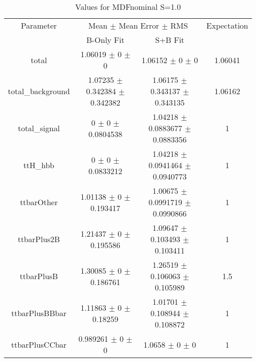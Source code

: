 \begin{table}
\centering
\caption{Values for MDFnominal S=1.0}
\begin{tabular}{cccc}
\toprule
Parameter & \multicolumn{2}{c}{Mean $\pm$ Mean Error $\pm$ RMS} & Expectation\\
 & B-Only Fit & S+B Fit & \\
\midrule
total & \num{1.06019} $\pm$ \num{0} $\pm$ \num{0} & \num{1.06152} $\pm$ \num{0} $\pm$ \num{0} & \num{1.06041}\\
total\_background & \num{1.07235} $\pm$ \num{0.342384} $\pm$ \num{0.342382} & \num{1.06175} $\pm$ \num{0.343137} $\pm$ \num{0.343135} & \num{1.06162}\\
total\_signal & \num{0} $\pm$ \num{0} $\pm$ \num{0.0804538} & \num{1.04218} $\pm$ \num{0.0883677} $\pm$ \num{0.0883356} & \num{1}\\
ttH\_hbb & \num{0} $\pm$ \num{0} $\pm$ \num{0.0833212} & \num{1.04218} $\pm$ \num{0.0941464} $\pm$ \num{0.0940773} & \num{1}\\
ttbarOther & \num{1.01138} $\pm$ \num{0} $\pm$ \num{0.193417} & \num{1.00675} $\pm$ \num{0.0991719} $\pm$ \num{0.0990866} & \num{1}\\
ttbarPlus2B & \num{1.21437} $\pm$ \num{0} $\pm$ \num{0.195586} & \num{1.09647} $\pm$ \num{0.103493} $\pm$ \num{0.103411} & \num{1}\\
ttbarPlusB & \num{1.30085} $\pm$ \num{0} $\pm$ \num{0.186761} & \num{1.26519} $\pm$ \num{0.106063} $\pm$ \num{0.105989} & \num{1.5}\\
ttbarPlusBBbar & \num{1.11863} $\pm$ \num{0} $\pm$ \num{0.18259} & \num{1.01701} $\pm$ \num{0.108944} $\pm$ \num{0.108872} & \num{1}\\
ttbarPlusCCbar & \num{0.989261} $\pm$ \num{0} $\pm$ \num{0} & \num{1.0658} $\pm$ \num{0} $\pm$ \num{0} & \num{1}\\
\bottomrule
\end{tabular}
\end{table}